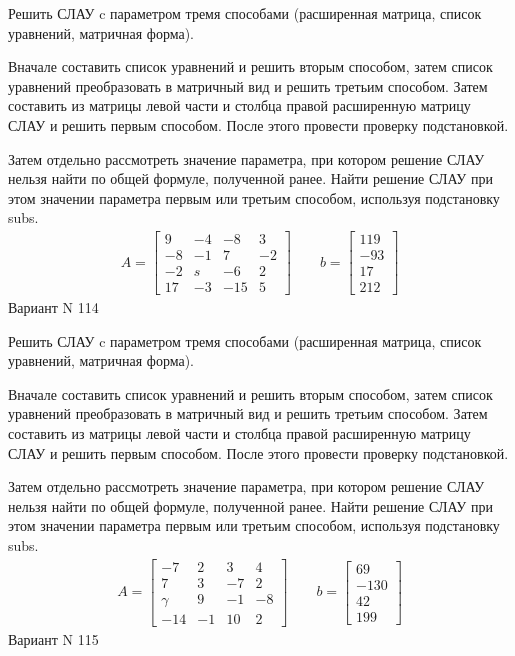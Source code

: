 \documentclass[11pt]{report}
\begin{document}
Решить СЛАУ c параметром тремя способами (расширенная матрица, список уравнений, матричная форма).

Вначале составить список уравнений и решить вторым способом,
затем список уравнений преобразовать в матричный вид и решить третьим способом.
Затем составить из матрицы левой части и столбца правой расширенную матрицу СЛАУ и решить первым способом.
После этого провести проверку подстановкой.

Затем отдельно рассмотреть значение параметра, при котором решение СЛАУ нельзя найти по общей формуле,
полученной ранее.
Найти решение СЛАУ при этом значении параметра первым или третьим способом, используя подстановку subs.
\begin{align*}
    A = \left[\begin{matrix}9 & -4 & -8 & 3\\-8 & -1 & 7 & -2\\-2 & s & -6 & 2\\17 & -3 & -15 & 5\end{matrix}\right]
\qquad b = \left[\begin{matrix}119\\-93\\17\\212\end{matrix}\right]
\end{align*}
\newpage
Вариант N 114


Решить СЛАУ c параметром тремя способами (расширенная матрица, список уравнений, матричная форма).

Вначале составить список уравнений и решить вторым способом,
затем список уравнений преобразовать в матричный вид и решить третьим способом.
Затем составить из матрицы левой части и столбца правой расширенную матрицу СЛАУ и решить первым способом.
После этого провести проверку подстановкой.

Затем отдельно рассмотреть значение параметра, при котором решение СЛАУ нельзя найти по общей формуле,
полученной ранее.
Найти решение СЛАУ при этом значении параметра первым или третьим способом, используя подстановку subs.
\begin{align*}
    A = \left[\begin{matrix}-7 & 2 & 3 & 4\\7 & 3 & -7 & 2\\\gamma & 9 & -1 & -8\\-14 & -1 & 10 & 2\end{matrix}\right]
\qquad b = \left[\begin{matrix}69\\-130\\42\\199\end{matrix}\right]
\end{align*}
\newpage
Вариант N 115
\end{document}
